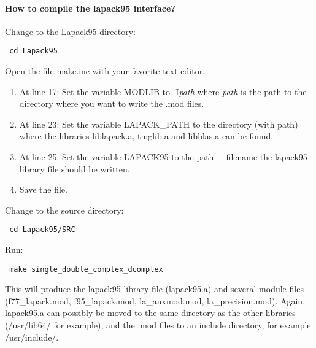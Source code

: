\documentclass[11p,a4paper]{article}
\begin{document}
\paragraph{How to compile the lapack95 interface?}
Change to the Lapack95 directory:
\begin{verbatim}
 cd Lapack95
\end{verbatim}
Open the file make.inc with your favorite text editor. 
\begin{enumerate}
 \item At line 17: Set the variable MODLIB to -I\textit{path} where \textit{path} is the path to the directory where you want to write the .mod files.
 \item At line 23: Set the variable LAPACK\_PATH to the directory (with path) where the libraries liblapack.a, tmglib.a and libblas.a can be found.
 \item At line 25: Set the variable LAPACK95 to the path + filename the lapack95 library file should be written. 
 \item Save the file.
\end{enumerate}
Change to the source directory:
\begin{verbatim}
 cd Lapack95/SRC
\end{verbatim}
Run:
\begin{verbatim}
 make single_double_complex_dcomplex
\end{verbatim}
This will produce the lapack95 library file (lapack95.a) and several module files (f77\_lapack.mod, f95\_lapack.mod, la\_auxmod.mod, la\_precision.mod). Again, lapack95.a can possibly be moved to the same directory as the other libraries (/usr/lib64/ for example), and the .mod files to an include directory, for example /usr/include/.
\end{document}
